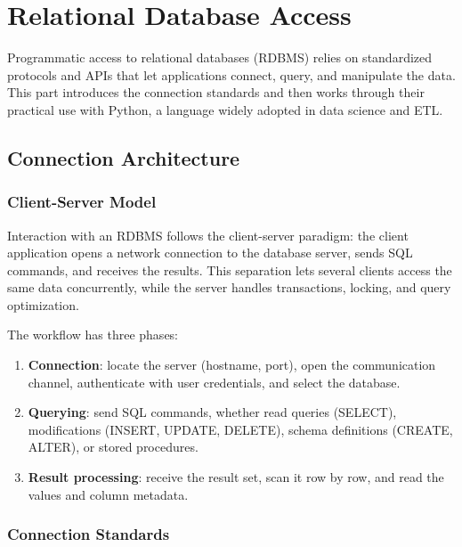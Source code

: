 
\section{Relational Database Access}
\label{part:rdbms-access}

Programmatic access to relational databases (RDBMS) relies on standardized protocols and APIs that let applications connect, query, and manipulate the data. This part introduces the connection standards and then works through their practical use with Python, a language widely adopted in data science and ETL.

\subsection{Connection Architecture}
\label{sec:connection-architecture}

\subsubsection{Client-Server Model}
\label{subsec:client-server-model}

Interaction with an RDBMS follows the client-server paradigm: the client application opens a network connection to the database server, sends SQL commands, and receives the results. This separation lets several clients access the same data concurrently, while the server handles transactions, locking, and query optimization.

The workflow has three phases:

\begin{enumerate}
    \item \textbf{Connection}: locate the server (hostname, port), open the communication channel, authenticate with user credentials, and select the database.
    \item \textbf{Querying}: send SQL commands, whether read queries (SELECT), modifications (INSERT, UPDATE, DELETE), schema definitions (CREATE, ALTER), or stored procedures.
    \item \textbf{Result processing}: receive the result set, scan it row by row, and read the values and column metadata.
\end{enumerate}

\subsubsection{Connection Standards}
\label{subsec:connection-standards}

